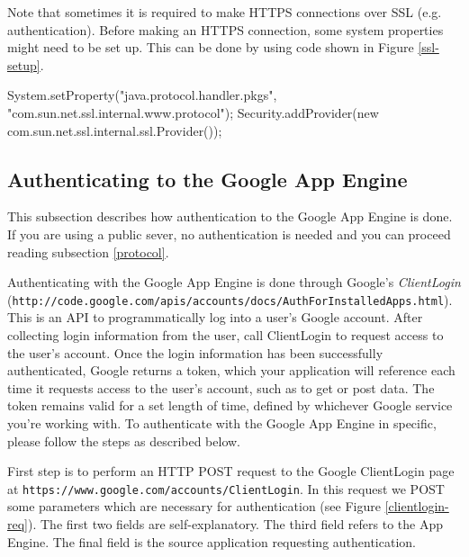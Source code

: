 Note that sometimes it is required to make HTTPS connections over SSL
(e.g. authentication). Before making an HTTPS connection, some system
properties might need to be set up. This can be done by using code shown in
Figure \ref{ssl-setup}.

\begin{figure*}[ht] %
\begin{center}
\begin{code}
System.setProperty("java.protocol.handler.pkgs",
                        "com.sun.net.ssl.internal.www.protocol");
Security.addProvider(new com.sun.net.ssl.internal.ssl.Provider());
\end{code}
\caption{Setting up SSL.\label{ssl-setup}}
\end{center}
\end{figure*}

\subsection{Authenticating to the Google App Engine}
\label{auth}
This subsection describes how authentication to the Google App Engine is done. If
you are using a public sever, no authentication is needed and you can proceed
reading subsection \ref{protocol}.

Authenticating with the Google App Engine is done through Google's
\emph{ClientLogin}
(\texttt{http://code.google.com/apis/accounts/docs/AuthForInstalledApps.html}).
This is an API to programmatically log into a user's Google account. After
collecting login information from the user, call ClientLogin to request access
to
the user's account. Once the login information has been successfully
authenticated, Google returns a token, which your application will reference
each
time it requests access to the user's account, such as to get or post data. The
token remains valid for a set length of time, defined by whichever Google
service
you're working with. To authenticate with the Google App Engine in specific,
please follow the steps as described below.

First step is to perform an HTTP POST request to the Google ClientLogin page at
\texttt{https://www.google.com/accounts/ClientLogin}. In this request we POST
some parameters which are necessary for authentication (see Figure
\ref{clientlogin-req}). The first two fields are self-explanatory. The third
field refers to the App Engine. The final field is the source application
requesting authentication.

